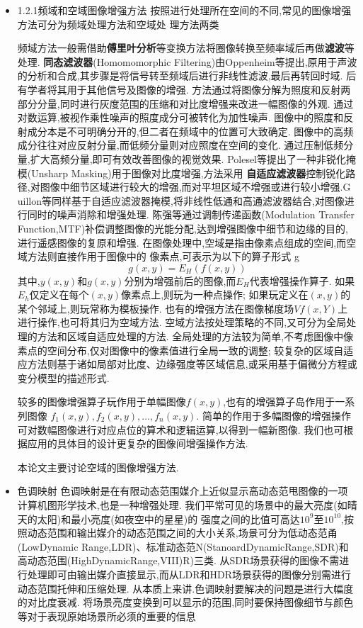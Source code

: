 \message{ !name(main.tex)}\documentclass{amsart}
\begin{document}
\begin{itemize}
\item 1.2.1频域和空域图像增强方法
按照进行处理所在空间的不同,常见的图像增强方法可分为频域处理方法和空域处
理方法两类
\begin{itemize}
  频域方法一般需借助\textbf{傅里叶分析}等变换方法将圈像转换至频率域后再做\textbf{滤波}等处理.
\textbf{同态滤波器}(Homomomorphic Filtering)由Oppenheim等提出,原用于声波的分析和合成,其步骤是将信号转至频域后进行非线性滤波,最后再转回时域.
  后有学者将其用于其他信号及图像的增强.
  方法通过将图像分解为照度和反射两部分分量,同时进行灰度范围的压缩和对比度增强来改进一幅图像的外观.
  通过对数运算,被视作乘性噪声的照度成分可被转化为加性噪声.
  图像中的照度和反射成分本是不可明确分开的,但二者在频域中的位置可大致确定.
  图像中的高频成分往往对应反射分量,而低频分量则对应照度在空间的变化.
  通过压制低频分量,扩大高频分量,即可有效改善图像的视觉效果.
  Polesel等提出了一种非锐化掩模(Unsharp Masking)用于图像对比度增强,方法采用
  \textbf{自适应滤波器}控制锐化路径,对图像中细节区域进行较大的增强,而对平坦区域不增强或进行较小增强.G
  uillon等同样基于自适应滤波器掩模,将非线性低通和高通滤波器结合,对图像进行同时的噪声消除和增强处理.
  陈强等通过调制传递函数(Modulation Transfer Function,MTF)补偿调整图像的光能分配,达到增强图像中细节和边缘的目的,进行遥感图像的复原和增强.
在图像处理中,空域是指由像素点组成的空间,而空域方法则直接作用于图像中的
像素点,可表示为以下的算子形式
g
\begin{equation}
  \label{eq:10}
  g(x,y)=E_H(f(x,y))
\end{equation}
其中,$y(x,y)$和$g(x,y)$分别为增强前后的图像,而$E_H$代表增强操作算子.
如果$E_h$仅定义在每个$(x,y)$像素点上,则玩为一种点操作;
如果玩定义在$(x,y)$的某个邻域上,则玩常称为模板操作.
也有的增强方法在图像梯度场$Vf(x,Y)$上进行操作,也可将其归为空域方法.
空域方法按处理策略的不同,又可分为全局处理的方法和区域自适应处理的方法.
全局处理的方法较为简单,不考虑图像中像素点的空间分布,仅对图像中的像素值进行全局一致的调整;
较复杂的区域自适应方法则基于诸如局部对比度、边缘强度等区域信息,或采用基于偏微分方程或变分模型的描述形式.


较多的图像增强算子玩作用于单幅图像$f(x,y)$,也有的增强算子岛作用于一系列图像
$f_1(x,y),f_2(x,y),\dots,f_n(x,y)$.
简单的作用于多幅图像的增强操作可对数幅图像进行对应点位的算术和逻辑运算,以得到一幅新图像.
我们也可根据应用的具体目的设计更复杂的图像间增强操作方法.

本论文主要讨论空域的图像增强方法.
\end{itemize}
\item 色调映射
  色调映射是在有限动态范围媒介上近似显示高动态范甩图像的一项计算机图形学技术,也是一种增强处理.
我们平常可见的场景中的最大亮度(如晴天的太阳)和最小亮度(如夜空中的星星)的
强度之间的比值可高达$10^9$至$10^{10}$,按照动态范围和输出媒介的动态范围之间的大小关系,场景可分为低动态范甬(LowDynamic Range,LDR)、标准动态范N(StanoardDynamicRange,SDR)和高动态范围(HighDynamicRange,VIII)R)三类.
从SDR场景获得的图像不需进行处理即可由输出媒介直接显示,而从LDR和HDR场景获得的图像分别需进行动态范围托伸和压缩处理.
从本质上来讲.色调映射要解决的问题是进行大幅度的对比度衰减.
将场景亮度变换到可以显示的范围,同时要保持图像细节与颜色等对于表现原始场景所必须的重要的信息


\end{itemize}
\end{document}
